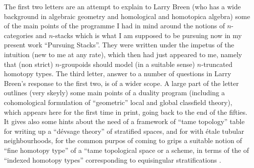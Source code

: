 The first two letters are an attempt to explain to Larry Breen (who has a wide background in algebraic geometry and homological and homotopica algebra) some of the main points of the programme I had in mind around the notions of $n$-categories and $n$-stacks\deleted{,} \handwritten{(}which is what I am supposed to be pursuing now in my present work ``Pursuing Stacks''\handwritten{)}. They were written under the impetus of the  intuition  (new to me at any rate), which then had just appeared to me, namely that (non strict) $n$-groupoids should model (in a suitable sense) $n$-truncated homotopy types.\handwritten{\(\mathord{/\mkern-5mu/}\)} The third letter,  answer to a number of questions in Larry Breen's response to the first two, is of a wider scope. A large part of the letter outlines (very skeyly) some main points of a duality program (including a cohomological formulation of ``geometric'' local and global classfield theory), which appears here for the first time in print,  going back to the end of the fifties. It gives also some hints about the need of a framework of ``tame topology'' table for writing up a ``dévsage theory'' of stratified spaces, and for  with étale tubular neighbourhoods, for the common purpos of coming to grips  a suitable notion of ``fine homotopy type'' of a ``tame topological space or  a scheme, in terms of the  of ``indexed homotopy types'' corresponding to equisingular stratifications .
